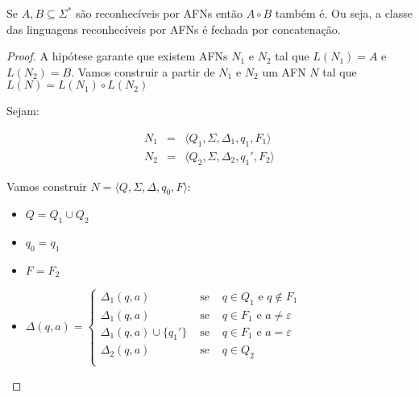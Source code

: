 \begin{lemma}
Se $A, B \subseteq \Sigma^*$ são reconhecíveis por AFNs então $A \circ B$ também é.
  Ou seja, a classe das linguagens reconhecíveis por AFNs é fechada por concatenação.
\end{lemma}
\begin{proof}
  A hipótese garante que existem AFNs $N_1$ e $N_2$ tal que $L(N_1) = A$ e $L(N_2) = B$.
  Vamos construir a partir de $N_1$ e $N_2$ um AFN $N$ tal que $L(N) = L(N_1) \circ L(N_2)$

  Sejam:

  \begin{eqnarray*}
    N_1 & = & \langle Q_1, \Sigma, \Delta_1, q_1, F_1 \rangle\\
    N_2 & = & \langle Q_2, \Sigma, \Delta_2, q_1', F_2 \rangle
  \end{eqnarray*}

  Vamos construir $N = \langle Q, \Sigma, \Delta, q_0, F \rangle$:

  \begin{itemize}
  \item[] $Q = Q_1 \cup Q_2$
  \item[] $q_0 = q_1$
  \item[] $F = F_2$
  \item[] $\Delta(q,a) = \left\{
    \begin{array}{ccc}
      \Delta_1(q, a) & \textrm{ se } & q \in Q_1 \textrm{ e } q \notin F_1\\
      \Delta_1(q, a) & \textrm{ se } & q \in F_1 \textrm{ e } a \neq \varepsilon\\
      \Delta_1(q, a) \cup \{q_1'\} & \textrm{ se } & q \in F_1 \textrm{ e } a = \varepsilon\\
      \Delta_2(q, a) & \textrm{ se } & q \in Q_2\\
     \end{array}\right.$
  \end{itemize}


\end{proof}

